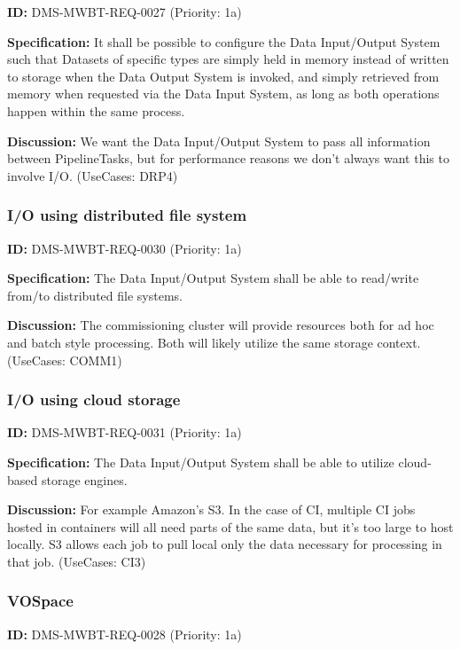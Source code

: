 \documentclass[SE,toc,lsstdraft]{lsstdoc}
\begin{document}
\label{DMS-MWBT-REQ-0027}
\textbf{ID:} DMS-MWBT-REQ-0027 (Priority: 1a)

\textbf{Specification:}
It shall be possible to configure the Data Input/Output System such that Datasets of specific types are simply held in memory instead of written to storage when the Data Output System is invoked, and simply retrieved from memory when requested via the Data Input System, as long as both operations happen within the same process.

\textbf{Discussion:}
We want the Data Input/Output System to pass all information between PipelineTasks, but for performance reasons we don't always want this to involve I/O. (UseCases: DRP4)

\subsubsection{I/O using distributed file system}

\label{DMS-MWBT-REQ-0030}
\textbf{ID:} DMS-MWBT-REQ-0030 (Priority: 1a)

\textbf{Specification:}
The Data Input/Output System shall be able to read/write from/to distributed file systems.

\textbf{Discussion:}
The commissioning cluster will provide resources both for ad hoc and batch style processing. Both will likely utilize the same storage context. (UseCases: COMM1)

\subsubsection{I/O using cloud storage}

\label{DMS-MWBT-REQ-0031}
\textbf{ID:} DMS-MWBT-REQ-0031 (Priority: 1a)

\textbf{Specification:}
The Data Input/Output System shall be able to utilize cloud-based storage engines.

\textbf{Discussion:}
For example Amazon's S3. In the case of CI, multiple CI jobs hosted in containers will all need parts of the same data, but it's too large to host locally. S3 allows each job to pull local only the data necessary for processing in that job. (UseCases: CI3)

\subsubsection{VOSpace}

\label{DMS-MWBT-REQ-0028}
\textbf{ID:} DMS-MWBT-REQ-0028 (Priority: 1a)
\end{document}
